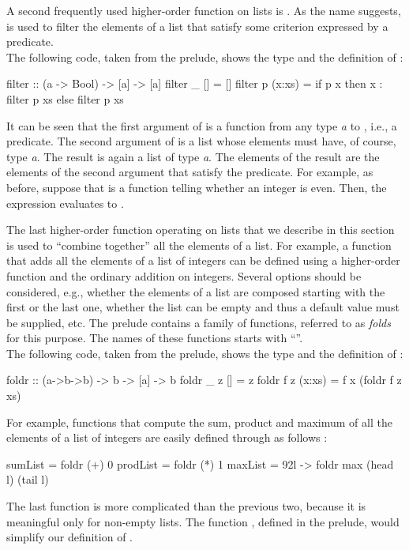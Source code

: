 A second frequently used higher-order function on lists is .
As the name suggests,  is used to filter
the elements of a list that satisfy some criterion
expressed by a predicate.
\\[1ex]
The following code, taken from the prelude, shows
the type and the definition of :
%
\begin{prog}
filter          :: (a -> Bool) -> [a] -> [a]
filter _ []     = []
filter p (x:xs) = if p x then x : filter p xs else filter p xs
\end{prog}
%
It can be seen that the first argument of 
is a function from any type \emph{a} to ,
i.e., a predicate.
The second argument of  is a list whose elements
must have, of course, type \emph{a}.
The result is again a list of type \emph{a}.
The elements of the result are the elements of the second
argument that satisfy the predicate.
For example, as before, suppose that  is a function
telling whether an integer is even.
Then, the expression 
evaluates to \code{[0,2]}.

The last higher-order function operating on lists that
we describe in this section is used to ``combine together''
all the elements of a list.
For example, a function that adds all the elements of
a list of integers can be defined using a higher-order function and
the ordinary addition on integers.
Several options should be considered, e.g., whether the
elements of a list are composed starting with the first or
the last one, whether the list can be empty and thus
a default value must be supplied, etc.
The prelude contains a family of functions, referred to
as \emph{folds} for this purpose. The names of these
functions starts with ``''.
\\[1ex]
The following code, taken from the prelude, shows
the type and the definition of :
%
\begin{prog}
foldr            :: (a->b->b) -> b -> [a] -> b
foldr _ z []     = z
foldr f z (x:xs) = f x (foldr f z xs)
\end{prog}
%
For example, functions that compute the sum, product and maximum
of all the elements of a list of integers are easily defined
through  as follows
:
%
\begin{prog}
sumList  = foldr (+) 0
prodList = foldr (*) 1
maxList  = \char92l -> foldr max (head l) (tail l)
\end{prog}
%
The last function is more complicated than the previous two,
because it is meaningful only for non-empty lists.
The function , defined in the prelude,
would simplify our definition of .

